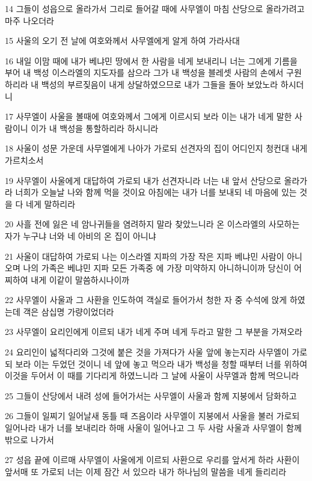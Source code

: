 \par 14 그들이 성읍으로 올라가서 그리로 들어갈 때에 사무엘이 마침 산당으로 올라가려고 마주 나오더라
\par 15 사울의 오기 전 날에 여호와께서 사무엘에게 알게 하여 가라사대
\par 16 내일 이맘 때에 내가 베냐민 땅에서 한 사람을 네게 보내리니 너는 그에게 기름을 부어 내 백성 이스라엘의 지도자를 삼으라 그가 내 백성을 블레셋 사람의 손에서 구원하리라 내 백성의 부르짖음이 내게 상달하였으므로 내가 그들을 돌아 보았노라 하시더니
\par 17 사무엘이 사울을 볼때에 여호와께서 그에게 이르시되 보라 이는 내가 네게 말한 사람이니 이가 내 백성을 통할하리라 하시니라
\par 18 사울이 성문 가운데 사무엘에게 나아가 가로되 선견자의 집이 어디인지 청컨대 내게 가르치소서
\par 19 사무엘이 사울에게 대답하여 가로되 내가 선견자니라 너는 내 앞서 산당으로 올라가라 너희가 오늘날 나와 함께 먹을 것이요 아침에는 내가 너를 보내되 네 마음에 있는 것을 다 네게 말하리라
\par 20 사흘 전에 잃은 네 암나귀들을 염려하지 말라 찾았느니라 온 이스라엘의 사모하는 자가 누구냐 너와 네 아비의 온 집이 아니냐
\par 21 사울이 대답하여 가로되 나는 이스라엘 지파의 가장 작은 지파 베냐민 사람이 아니오며 나의 가족은 베냐민 지파 모든 가족중 에 가장 미약하지 아니하니이까 당신이 어찌하여 내게 이같이 말씀하시나이까
\par 22 사무엘이 사울과 그 사환을 인도하여 객실로 들어가서 청한 자 중 수석에 앉게 하였는데 객은 삼십명 가량이었더라
\par 23 사무엘이 요리인에게 이르되 내가 네게 주며 네게 두라고 말한 그 부분을 가져오라
\par 24 요리인이 넓적다리와 그것에 붙은 것을 가져다가 사울 앞에 놓는지라 사무엘이 가로되 보라 이는 두었던 것이니 네 앞에 놓고 먹으라 내가 백성을 청할 때부터 너를 위하여 이것을 두어서 이 때를 기다리게 하였느니라 그 날에 사울이 사무엘과 함께 먹으니라
\par 25 그들이 산당에서 내려 성에 들어가서는 사무엘이 사울과 함께 지붕에서 담화하고
\par 26 그들이 일찌기 일어날새 동틀 때 즈음이라 사무엘이 지붕에서 사울을 불러 가로되 일어나라 내가 너를 보내리라 하매 사울이 일어나고 그 두 사람 사울과 사무엘이 함께 밖으로 나가서
\par 27 성읍 끝에 이르매 사무엘이 사울에게 이르되 사환으로 우리를 앞서게 하라 사환이 앞서매 또 가로되 너는 이제 잠간 서 있으라 내가 하나님의 말씀을 네게 들리리라

